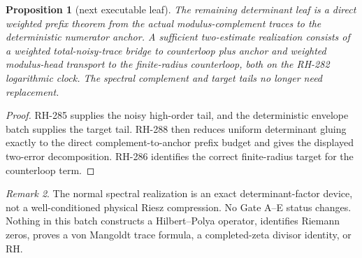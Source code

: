 \documentclass[11pt]{article}
\newtheorem{proposition}{Proposition}[section]
\theoremstyle{remark}\newtheorem{remark}[proposition]{Remark}
\begin{document}
\begin{proposition}[next executable leaf]
The remaining determinant leaf is a direct weighted prefix theorem from the
actual modulus-complement traces to the deterministic numerator anchor.  A
sufficient two-estimate realization consists of a weighted total-noisy-trace
bridge to counterloop plus anchor and weighted modulus-head transport to the
finite-radius counterloop, both on the RH-282 logarithmic clock.  The spectral
complement and target tails no longer need replacement.
\end{proposition}
\begin{proof}
RH-285 supplies the noisy high-order tail, and the deterministic envelope
batch supplies the target tail.  RH-288 then reduces uniform determinant
gluing exactly to the direct complement-to-anchor prefix budget and gives the
displayed two-error decomposition.  RH-286 identifies the correct
finite-radius target for the counterloop term.
\end{proof}

\begin{remark}
The normal spectral realization is an exact determinant-factor device, not a
well-conditioned physical Riesz compression.  No Gate A--E status changes.
Nothing in this batch constructs a Hilbert--Polya operator, identifies
Riemann zeros, proves a von Mangoldt trace formula, a completed-zeta divisor
identity, or RH.
\end{remark}
\end{document}
